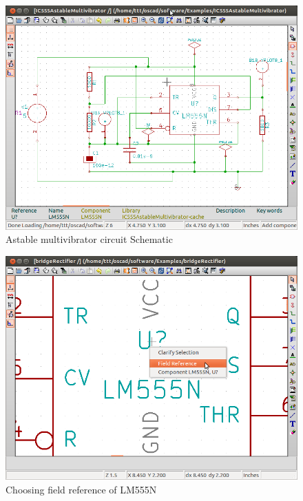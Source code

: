 \begin{figure}[t]%
\begin{center}
\includegraphics[width=1\linewidth]{figures/555-schematic.png}%
\caption{Astable multivibrator circuit Schematic}
\label{LM555N}
\end{center}
\end{figure}


\begin{figure}[t]%
\begin{center}
\includegraphics[width=1\linewidth]{figures/555-field-ref.png}%
\caption{Choosing field reference of LM555N}
\label{555-field-ref}
\end{center}
\end{figure}

